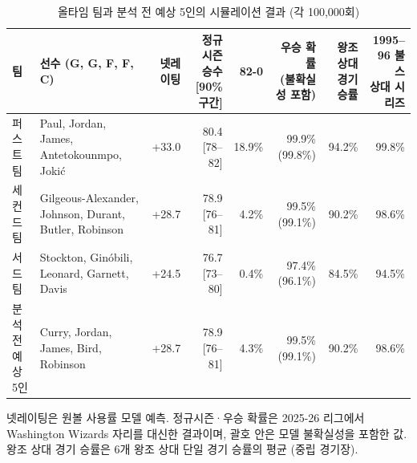 \begin{table}[t]
\centering
\caption{올타임 팀과 분석 전 예상 5인의 시뮬레이션 결과 (각 100,000회)}
\label{tab:alltime}
\footnotesize
\setlength{\tabcolsep}{3pt}
\begin{tabular}{@{}llrrrrrr@{}}
\toprule
팀 & 선수 (G, G, F, F, C) & 넷레이팅 & \shortstack{정규시즌 승수\\{[}90\% 구간{]}} & 82-0 & \shortstack{우승 확률\\(불확실성 포함)} & \shortstack{왕조 상대\\경기 승률} & \shortstack{1995--96 불스\\상대 시리즈} \\
\midrule
퍼스트 팀 & Paul, Jordan, James, Antetokounmpo, Jokić & +33.0 & 80.4 [78--82] & 18.9\% & 99.9\% (99.8\%) & 94.2\% & 99.8\% \\
세컨드 팀 & Gilgeous-Alexander, Johnson, Durant, Butler, Robinson & +28.7 & 78.9 [76--81] & 4.2\% & 99.5\% (99.1\%) & 90.2\% & 98.6\% \\
서드 팀 & Stockton, Ginóbili, Leonard, Garnett, Davis & +24.5 & 76.7 [73--80] & 0.4\% & 97.4\% (96.1\%) & 84.5\% & 94.5\% \\
분석 전 예상 5인 & Curry, Jordan, James, Bird, Robinson & +28.7 & 78.9 [76--81] & 4.3\% & 99.5\% (99.1\%) & 90.2\% & 98.6\% \\
\bottomrule
\end{tabular}

\vspace{2pt}
\parbox{0.95\textwidth}{\scriptsize 넷레이팅은 원볼 사용률 모델 예측. 정규시즌·우승 확률은 2025-26 리그에서 Washington Wizards 자리를 대신한 결과이며, 괄호 안은 모델 불확실성을 포함한 값. 왕조 상대 경기 승률은 6개 왕조 상대 단일 경기 승률의 평균 (중립 경기장).}
\end{table}
